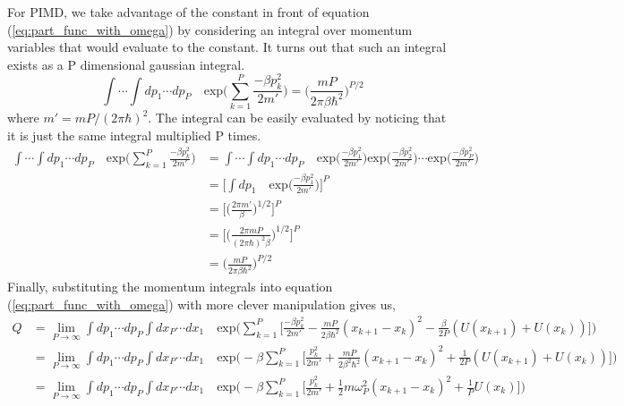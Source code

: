 \documentclass{article}
\newcommand{\be}{\begin{equation}}
\newcommand{\ee}{\end{equation}}
\begin{document}
For PIMD, we take advantage of the constant in front of equation (\ref{eq:part_func_with_omega}) by considering an integral over momentum variables that would evaluate to the constant.
It turns out that such an integral exists as a P dimensional gaussian integral.
\be
  \int \cdots \int dp_1 \cdots dp_P \quad \text{exp}\Big( \sum_{k=1}^P \frac{-\beta p^2_k}{2m'} \Big) = \Big( \frac{mP}{2 \pi \beta \hbar^2} \Big)^{P/2}
\ee
where $m' = mP/(2 \pi \hbar)^2$.
The integral can be easily evaluated by noticing that it is just the same integral multiplied P times.
\be
  \begin{split}
    \int \cdots \int dp_1 \cdots dp_P \quad \text{exp}\Big( \sum_{k=1}^P \frac{-\beta p^2_k}{2m'} \Big) &= \int \cdots \int dp_1 \cdots dp_P \quad \text{exp}\Big(\frac{-\beta p^2_1}{2m'} \Big) \text{exp}\Big( \frac{-\beta p^2_2}{2m'}\Big) \cdots \text{exp}\Big( \frac{-\beta p^2_P}{2m'} \Big) \\
    &= \Big[ \int dp_1 \quad \text{exp} \Big( \frac{-\beta p^2_1}{2m'} \Big)\Big]^P \\
    &= \Big[ \Big( \frac{2 \pi m'}{\beta} \Big)^{1/2} \Big]^P \\
    &= \Big[ \Big( \frac{2 \pi m P}{(2 \pi \hbar)^2 \beta } \Big)^{1/2} \Big]^P \\
    &= \Big( \frac{mP}{2 \pi \beta \hbar^2} \Big)^{P/2}
  \end{split}
\ee
Finally, substituting the momentum integrals into equation (\ref{eq:part_func_with_omega}) with more clever manipulation gives us,
\be
  \begin{split}
    Q &= \lim_{P \to\infty} \int dp_1 \cdots dp_P \int dx_P \cdots dx_1 \quad \text{exp}\Big( \sum_{k=1}^P \Big[ \frac{-\beta p^2_k}{2m'} - \frac{mP}{2 \beta \hbar^2}(x_{k+1} - x_k)^2 - \frac{\beta}{2P}(U(x_{k+1}) + U(x_k)) \Big] \Big) \\
    &= \lim_{P \to\infty} \int dp_1 \cdots dp_P \int dx_P \cdots dx_1 \quad \text{exp}\Big( - \beta \sum_{k=1}^P \Big[ \frac{p^2_k}{2m'} + \frac{mP}{2 \beta^2 \hbar^2}(x_{k+1} - x_k)^2 + \frac{1}{2P}(U(x_{k+1}) + U(x_k)) \Big] \Big) \\
    &= \lim_{P \to\infty} \int dp_1 \cdots dp_P \int dx_P \cdots dx_1 \quad \text{exp}\Big( - \beta \sum_{k=1}^P \Big[ \frac{p^2_k}{2m'} + \frac{1}{2} m \omega^2_P (x_{k+1} - x_k)^2 + \frac{1}{P} U(x_k) \Big] \Big) \\
  \end{split}
\ee



\end{document}
